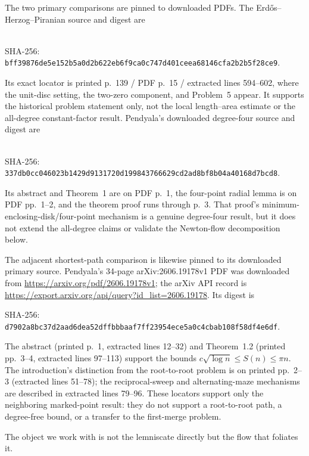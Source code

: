 \documentclass[11pt]{article}
\begin{document}
The two primary comparisons are pinned to downloaded PDFs.  The
Erd\H{o}s--Herzog--Piranian source and digest are
\begin{center}
\footnotesize
{}\\
SHA-256: \nolinkurl{bff39876de5e152b5a0d2b622eb6f9ca0c747d401ceea68146cfa2b2b5f28ce9}.
\end{center}
Its exact locator is printed p.~139 / PDF p.~15 / extracted lines 594--602,
where the unit-disc setting, the two-zero component, and Problem~5 appear.
It supports the historical problem statement only, not the local length--area
estimate or the all-degree constant-factor result.  Pendyala's downloaded
degree-four source and digest are
\begin{center}
\footnotesize
{}\\
SHA-256: \nolinkurl{337db0cc046023b1429d9131720d199843766629cd2ad8bf8b04a40168d7bcd8}.
\end{center}
Its abstract and Theorem~1 are on PDF p.~1, the four-point radial lemma is on
PDF pp.~1--2, and the theorem proof runs through p.~3.  That proof's
minimum-enclosing-disk/four-point mechanism is a genuine degree-four result,
but it does not extend the all-degree claims or validate the Newton-flow
decomposition below.

The adjacent shortest-path comparison is likewise pinned to its downloaded
primary source.  Pendyala's 34-page arXiv:2606.19178v1 PDF was downloaded from
\url{https://arxiv.org/pdf/2606.19178v1}; the arXiv API record is
\url{https://export.arxiv.org/api/query?id_list=2606.19178}.  Its digest is
\begin{center}
\footnotesize
SHA-256: \nolinkurl{d7902a8bc37d2aad6dea52dffbbbaaf7ff23954ece5a0c4cbab108f58df4e6df}.
\end{center}
The abstract (printed p.~1, extracted lines 12--32) and Theorem~1.2 (printed
pp.~3--4, extracted lines 97--113) support the bounds
$c\sqrt{\log n}\leq S(n)\leq\pi n$.  The introduction's distinction from the
root-to-root problem is on printed pp.~2--3 (extracted lines 51--78); the
reciprocal-sweep and alternating-maze mechanisms are described in extracted
lines 79--96.  These locators support only the neighboring marked-point result:
they do not support a root-to-root path, a degree-free bound, or a transfer to
the first-merge problem.

The object we work with is not the lemniscate directly but the flow that
foliates it.
\end{document}
